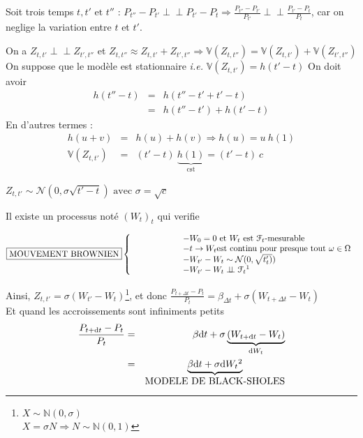 \documentclass{report}
\newcommand{\indep}{\perp \!\!\! \perp}
\begin{document}
Soit trois temps $t, t' \mbox{ et } t''$ : $P_{t''}-P_{t'} \indep P_{t'}-P_t \Rightarrow \displaystyle\frac{P_{t''}-P_{t'}}{P_{t'}} \indep \displaystyle\frac{P_{t'}-P_t}{P_t}$, car on neglige la variation entre $t$ et $t'$.

On a $Z_{t,t'} \indep Z_{t',t''}$ et $Z_{t,t''} \approx Z_{t,t'}+Z_{t',t''} \Rightarrow \mathbb{V}(Z_{t,t''}) = \mathbb{V}(Z_{t,t'})+\mathbb{V}(Z_{t',t''})$\newline
On suppose que le modèle est stationnaire \textit{i.e.} $\mathbb{V}(Z_{t,t'})=h(t'-t)$\newline
On doit avoir 
\begin{eqnarray}
h(t''-t) & = & h(t''-t'+t'-t) \nonumber\\
& = & h(t''-t')+h(t'-t) \nonumber
\end{eqnarray}
En d'autres termes : 
\begin{eqnarray}
h(u+v) & = & h(u)+h(v)\Rightarrow h(u) = u\ h(1) \nonumber\\
\mathbb{V}(Z_{t,t'})& = & (t'-t)\ \underbrace{h(1)}_{\mbox{cst}}= (t'-t)\ c \nonumber
\end{eqnarray}
\begin{center}
    $Z_{t,t'} \sim \mathcal{N}(0,\sigma \sqrt{t'-t})\mbox{ avec } \sigma = \sqrt{c}$
\end{center}

\vspace{0.5cm}
Il existe un processus noté $\left(W_t\right)_t$ qui verifie







\setlength{\columnsep}{100pt}
$\mbox{\fbox{MOUVEMENT BROWNIEN}}
\left\{ \hspace{2cm}\begin{array}{ll} 
-W_0 = 0 \mbox{ et } W_t \mbox{ est } \EuScript{F}_t\mbox{-mesurable}\\ 
-t\to W_t \mbox{est continu pour presque tout }\omega \in \Omega \\ 
-W_{t'}-W_t \sim \mathcal{N}(0, \sqrt{t'_t)})\\
-W_{t'}-W_t \indep \EuScript{F}_t \footnotemark
\end{array} \right.$

\vspace{0.5cm}
Ainsi, $Z_{t,t'} = \sigma(W_{t'}-W_t)$\footnote{$X\sim\mathbb{N}(0,\sigma)$\hspace{0.5cm}\\$X=\sigma N\Rightarrow N\sim \mathbb{N}(0,1)$}, et donc $\displaystyle\frac{P_{t+\Delta t} - P_t}{P_t} = \beta_{\Delta t} + \sigma (W_{t+\Delta t}-W_t)$\\
Et quand les accroissements sont infiniments petits
\begin{eqnarray}
\displaystyle\frac{P_{t+\mathrm{d} t} - P_t}{P_t} & = & \beta\mathrm{d} t+ \sigma \underbrace{(W_{t+\mathrm{d} t}-W_t)}_{\mathrm{d}W_t} \nonumber\\
& = & \underbrace{\beta\mathrm{d} t+ \sigma \mathrm{d}W_t\footnotemark}_{\mbox{MODELE DE BLACK-SHOLES}} \nonumber
\end{eqnarray}
\end{document}
